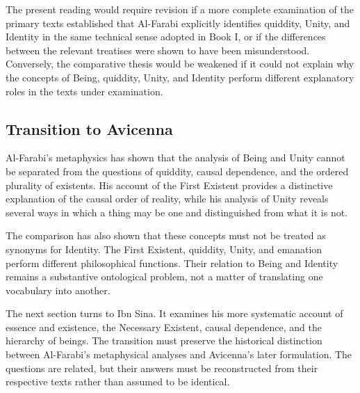 \label{para:VS.B01.P01.C08.S12.SS16.P005}

The present reading would
require revision if a
more complete examination
of the primary texts
established that Al-Farabi
explicitly identifies
quiddity, Unity, and
Identity in the same
technical sense adopted
in Book I, or if the
differences between
the relevant treatises
were shown to have
been misunderstood.
Conversely, the comparative
thesis would be weakened
if it could not explain
why the concepts of
Being, quiddity, Unity,
and Identity perform
different explanatory
roles in the texts
under examination.



\subsection{Transition to Avicenna}
\label{subsec:ch08-farabi-transition}

\label{para:VS.B01.P01.C08.S12.SS17.P001}

Al-Farabi's metaphysics has
shown that the analysis
of Being and Unity cannot
be separated from the
questions of quiddity,
causal dependence, and
the ordered plurality
of existents. His account
of the First Existent
provides a distinctive
explanation of the
causal order of reality,
while his analysis of
Unity reveals several
ways in which a thing
may be one and
distinguished from
what it is not.

\label{para:VS.B01.P01.C08.S12.SS17.P002}

The comparison has also
shown that these concepts
must not be treated as
synonyms for Identity.
The First Existent,
quiddity, Unity, and
emanation perform
different philosophical
functions. Their relation
to Being and Identity
remains a substantive
ontological problem,
not a matter of
translating one
vocabulary into another.

\label{para:VS.B01.P01.C08.S12.SS17.P003}

The next section turns
to Ibn Sina. It examines
his more systematic
account of essence
and existence, the
Necessary Existent,
causal dependence,
and the hierarchy
of beings. The transition
must preserve the
historical distinction
between Al-Farabi's
metaphysical analyses
and Avicenna's later
formulation. The
questions are related,
but their answers
must be reconstructed
from their respective
texts rather than
assumed to be identical.



